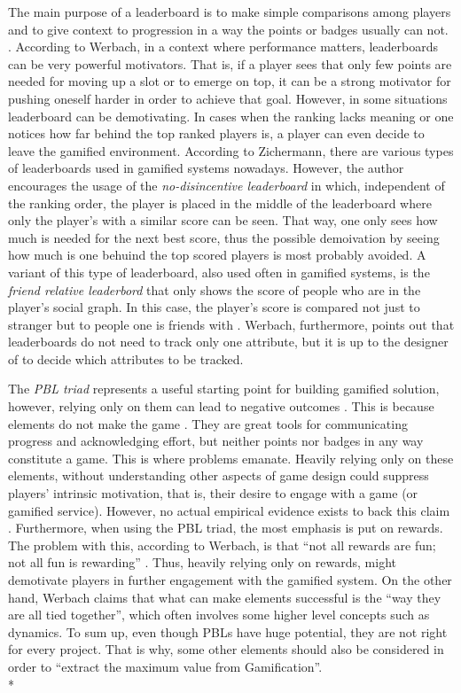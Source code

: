 \begin{enumerate}
The main purpose of a leaderboard is to make simple comparisons among players and to give context to progression in a way the points or badges usually can not. \cite{zichermann2011gamification, werbach2012win}. According to Werbach, in a context where performance matters, leaderboards can be very powerful motivators. That is, if a player sees that only few points are needed for moving up a slot or to emerge on top, it can be a strong motivator for pushing oneself harder in order to achieve that goal. However, in some situations leaderboard can be demotivating. In cases when the ranking lacks meaning or one notices how far behind the top ranked players is, a player can even decide to leave the gamified environment. According to Zichermann, there are various types of leaderboards used in gamified systems nowadays. However, the author encourages the usage of the \textit{no-disincentive leaderboard} in which, independent of the ranking order, the player is placed in the middle of the leaderboard where only the player's with a similar score can be seen. That way, one only sees how much is needed for the next best score, thus the possible demoivation by seeing how much is one behuind the top scored players is most probably avoided. A variant of this type of leaderboard, also used often in gamified systems, is the \textit{friend relative leaderbord} that only shows the score of people who are in the player's social graph. In this case, the player's score is compared not just to stranger but to people one is friends with \cite{WerbachCoursera}. Werbach, furthermore, points out that leaderboards do not need to track only one attribute, but it is up to the designer of to decide which attributes to be tracked. 
\end{enumerate}
The \textit{PBL triad} represents a useful starting point for building gamified solution, however, relying only on them can lead to negative outcomes \cite{werbach2012win}. This is because elements do not make the game \cite{werbach2012win, WerbachCoursera}. They are great tools for communicating progress and acknowledging effort, but neither points nor badges in any way constitute a game. This is where problems emanate. Heavily relying only on these elements, without understanding other aspects of game design could suppress players' intrinsic motivation, that is, their desire to engage with a game (or gamified service). However, no actual empirical evidence exists to back this claim \cite{mekler2013points}. Furthermore, when using the PBL triad, the most emphasis is put on rewards. The problem with this, according to Werbach, is that ``not all rewards are fun; not all fun is rewarding'' \cite{WerbachCoursera}. Thus, heavily relying only on rewards, might demotivate players in further engagement with the gamified system. On the other hand, Werbach claims that what can make elements successful is the ``way they are all tied together'', which often involves some higher level concepts such as dynamics. To sum up, even though PBLs have huge potential, they are not right for every project. That is why, some other elements should also be considered in order to ``extract the maximum value from Gamification''\cite{werbach2012win}. \\*
